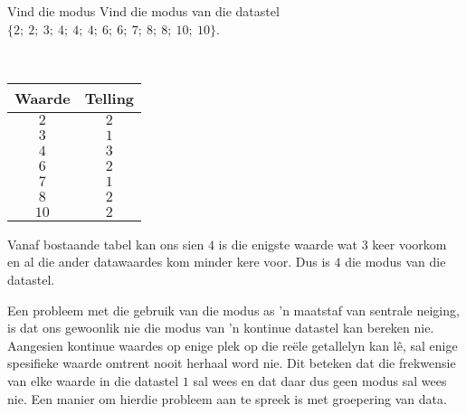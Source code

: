 \begin{wex}{Vind die modus}
{Vind die modus van die datastel $\{2;\ 2;\ 3;\ 4;\ 4;\ 4;\ 6;\ 6;\ 7;\ 8;\ 8;\ 10;\ 10\}$.}
{
\\
  \begin{center}
    \begin{tabular}{|c|c|} \hline
      \textbf{Waarde} & \textbf{Telling} \\ \hline

      $2$ & $2$ \\ \hline
      $3$ & $1$ \\\hline 
      $4$ & $3$ \\\hline
      $6$ & $2$ \\\hline
      $7$ & $1$ \\\hline
      $8$ & $2$ \\\hline
      $10$ & $2$ \\\hline

    \end{tabular}
  \end{center}


  Vanaf bostaande tabel kan ons sien $4$ is die enigste waarde wat $3$ keer voorkom en al die ander datawaardes kom minder kere voor. Dus is $4$ die modus van die datastel.
}
\end{wex}

Een probleem met die gebruik van die modus as ’n maatstaf van sentrale neiging, is dat ons gewoonlik nie die modus van ’n kontinue datastel kan bereken nie. Aangesien kontinue waardes op enige plek op die reële getallelyn kan lê, sal enige spesifieke waarde omtrent nooit herhaal word nie. Dit beteken dat die frekwensie van elke waarde in die datastel $1$ sal wees en dat daar dus geen modus sal wees nie. Een manier om hierdie probleem aan te spreek is met groepering van data.


